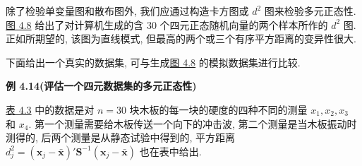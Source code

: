除了检验单变量图和散布图外, 我们应通过构造卡方图或 $d^{2}$ 图来检验多元正态性. \hyperref[fig:4.8]{图 4.8} 给出了对计算机生成的含 30 个四元正态随机向量的两个样本所作的 $d^{2}$ 图. 正如所期望的, 该图为直线模式, 但最高的两个或三个有序平方距离的变异性很大.

下面给出一个真实的数据集, 可与生成\hyperref[fig:4.8]{图 4.8} 的模拟数据集进行比较.

\noindent\textbf{例 4.14}\quad \textbf{(评估一个四元数据集的多元正态性)}

\hyperref[tab:4.3]{表 4.3} 中的数据是对 $n=30$ 块木板的每一块的硬度的四种不同的测量 $x_{1},x_{2},x_{3}$ 和 $x_{4}$. 第一个测量需要给木板传送一个向下的冲击波, 第二个测量是当木板振动时测得的, 后两个测量是从静态试验中得到的, 平方距离 $d_{j}^{2}=(\mathbf{x}_{j}-\bar{\mathbf{x}})'\mathbf{S}^{-1}(\mathbf{x}_{j}-\bar{\mathbf{x}})$ 也在表中给出.
